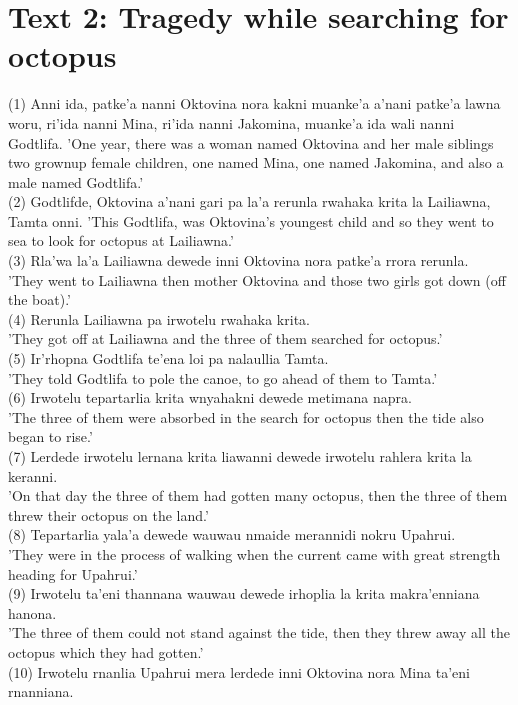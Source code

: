 \documentclass[10pt]{article}
\begin{document}
\section*{Text 2: Tragedy while searching for octopus}
(1) Anni ida, patke'a nanni Oktovina nora kakni muanke'a a'nani patke'a lawna woru, ri'ida nanni Mina, ri'ida nanni Jakomina, muanke'a ida wali nanni Godtlifa. 'One year, there was a woman named Oktovina and her male siblings two grownup female children, one named Mina, one named Jakomina, and also a male named Godtlifa.'\\
(2) Godtlifde, Oktovina a'nani gari pa la'a rerunla rwahaka krita la Lailiawna, Tamta onni. 'This Godtlifa, was Oktovina's youngest child and so they went to sea to look for octopus at Lailiawna.'\\
(3) Rla'wa la'a Lailiawna dewede inni Oktovina nora patke'a rrora rerunla.\\
'They went to Lailiawna then mother Oktovina and those two girls got down (off the boat).'\\
(4) Rerunla Lailiawna pa irwotelu rwahaka krita.\\
'They got off at Lailiawna and the three of them searched for octopus.'\\
(5) Ir'rhopna Godtlifa te'ena loi pa nalaullia Tamta.\\
'They told Godtlifa to pole the canoe, to go ahead of them to Tamta.'\\
(6) Irwotelu tepartarlia krita wnyahakni dewede metimana napra.\\
'The three of them were absorbed in the search for octopus then the tide also began to rise.'\\
(7) Lerdede irwotelu lernana krita liawanni dewede irwotelu rahlera krita la keranni.\\
'On that day the three of them had gotten many octopus, then the three of them threw their octopus on the land.'\\
(8) Tepartarlia yala'a dewede wauwau nmaide merannidi nokru Upahrui.\\
'They were in the process of walking when the current came with great strength heading for Upahrui.'\\
(9) Irwotelu ta'eni thannana wauwau dewede irhoplia la krita makra'enniana hanona.\\
'The three of them could not stand against the tide, then they threw away all the octopus which they had gotten.'\\
(10) Irwotelu rnanlia Upahrui mera lerdede inni Oktovina nora Mina ta'eni rnanniana.\\
\end{document}
